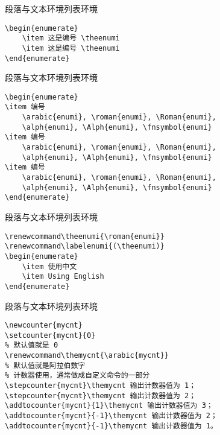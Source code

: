 \documentclass[11pt]{beamer}
\begin{document}
\begin{frame}[fragile]{段落与文本环境}{列表环境}
	\begin{Verbatim}[tabsize=2]
% enumi, enumii, enumiii, enumiv
\begin{enumerate}
	\item 这是编号 \theenumi
	\item 这是编号 \theenumi
\end{enumerate}
	\end{Verbatim}
\end{frame}

\begin{frame}[fragile]{段落与文本环境}{列表环境}
	\begin{Verbatim}[tabsize=2]
\begin{enumerate}
\item 编号
	\arabic{enumi}, \roman{enumi}, \Roman{enumi},
	\alph{enumi}, \Alph{enumi}, \fnsymbol{enumi}
\item 编号
	\arabic{enumi}, \roman{enumi}, \Roman{enumi},
	\alph{enumi}, \Alph{enumi}, \fnsymbol{enumi}
\item 编号
	\arabic{enumi}, \roman{enumi}, \Roman{enumi},
	\alph{enumi}, \Alph{enumi}, \fnsymbol{enumi}
\end{enumerate}
	\end{Verbatim}
\end{frame}

\begin{frame}[fragile]{段落与文本环境}{列表环境}
	\begin{Verbatim}[tabsize=2]
\renewcommand\theenumi{\roman{enumi}}
\renewcommand\labelenumi{(\theenumi)}
\begin{enumerate}
	\item 使用中文
	\item Using English
\end{enumerate}
	\end{Verbatim}
\end{frame}

\begin{frame}[fragile]{段落与文本环境}{列表环境}
	\begin{Verbatim}[tabsize=2]
% 计数器设置，通常在导言区
\newcounter{mycnt}
\setcounter{mycnt}{0}
% 默认值就是 0
\renewcommand\themycnt{\arabic{mycnt}}
% 默认值就是阿拉伯数字
% 计数器使用，通常做成自定义命令的一部分
\stepcounter{mycnt}\themycnt 输出计数器值为 1；
\stepcounter{mycnt}\themycnt 输出计数器值为 2；
\addtocounter{mycnt}{1}\themycnt 输出计数器值为 3；
\addtocounter{mycnt}{-1}\themycnt 输出计数器值为 2；
\addtocounter{mycnt}{-1}\themycnt 输出计数器值为 1。
	\end{Verbatim}
\end{frame}
\end{document}
